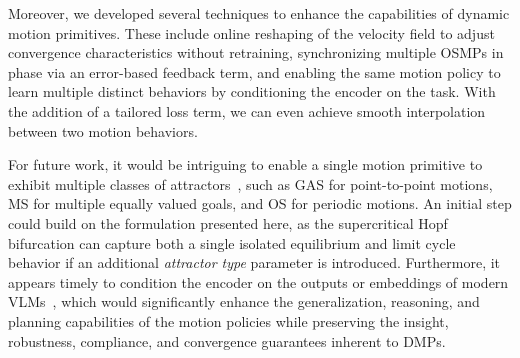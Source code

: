 Moreover, we developed several techniques to enhance the capabilities of dynamic motion primitives. These include online reshaping of the velocity field to adjust convergence characteristics without retraining, synchronizing multiple \glspl{OSMP} in phase via an error-based feedback term, and enabling the same motion policy to learn multiple distinct behaviors by conditioning the encoder on the task. With the addition of a tailored loss term, we can even achieve smooth interpolation between two motion behaviors.

For future work, it would be intriguing to enable a single motion primitive to exhibit multiple classes of attractors~\citep{strogatz2018nonlinear}, such as \gls{GAS} for point-to-point motions, \gls{MS} for multiple equally valued goals, and \gls{OS} for periodic motions. An initial step could build on the formulation presented here, as the supercritical Hopf bifurcation can capture both a single isolated equilibrium and limit cycle behavior if an additional \emph{attractor type} parameter is introduced. Furthermore, it appears timely to condition the encoder on the outputs or embeddings of modern \glspl{VLM}~\citep{o2024open, touvron2023llama, grattafiori2024llama}, which would significantly enhance the generalization, reasoning, and planning capabilities of the motion policies while preserving the insight, robustness, compliance, and convergence guarantees inherent to \glspl{DMP}.

